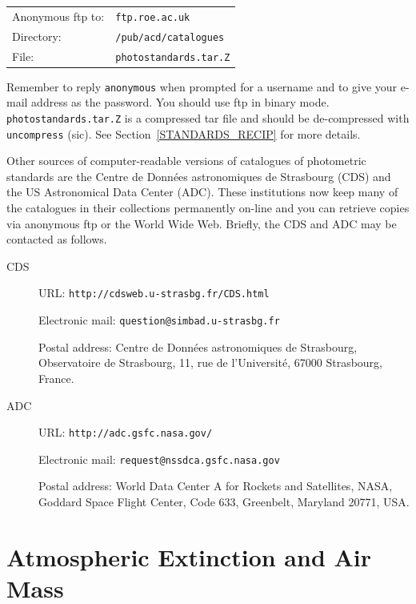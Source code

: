 \documentclass[twoside,11pt]{article}
\newcommand{\htmladdnormallink}[2]{#1}
\newcommand{\xlabel}[1]{}
\begin{document}
\begin{tabular}{ll}
Anonymous ftp to: & {\tt ftp.roe.ac.uk}        \\
Directory:        & {\tt /pub/acd/catalogues}  \\
File:             & {\tt photostandards.tar.Z} \\
\end{tabular}

Remember to reply {\tt anonymous} when prompted for a username and
to give your e-mail address as the password.  You should use ftp in
binary mode.  {\tt photostandards.tar.Z} is a compressed tar file
and should be de-compressed with {\tt uncompress} (sic).  See
Section~\ref{STANDARDS_RECIP} for more details.

Other sources of computer-readable versions of catalogues of photometric
standards are the Centre de Donn\'{e}es astronomiques de Strasbourg (CDS)
and the US Astronomical Data Center (ADC).  These institutions now keep
many of the catalogues in their collections permanently on-line and you
can retrieve copies via anonymous ftp or the World Wide Web.  Briefly,
the CDS and ADC may be contacted as follows.

\begin{description}

  \item[CDS] URL:
  \htmladdnormallink{ {\tt http://cdsweb.u-strasbg.fr/CDS.html} }
   {http://cdsweb.u-strasbg.fr/CDS.html}

   Electronic mail: {\tt question@simbad.u-strasbg.fr}

   Postal address: Centre de Donn\'{e}es astronomiques de
   Strasbourg, Observatoire de Strasbourg, 11, rue de l'Universit\'{e},
   67000 Strasbourg, France.

  \item[ADC]  URL: \htmladdnormallink{ {\tt http://adc.gsfc.nasa.gov/} }
   {http://adc.gsfc.nasa.gov/}

   Electronic mail: {\tt request@nssdca.gsfc.nasa.gov}

   Postal address: World Data Center A for Rockets and
   Satellites, NASA, Goddard Space Flight Center, Code 633,
   Greenbelt, Maryland 20771, USA.

\end{description}


\section{\xlabel{AIRMASS}\label{AIRMASS}Atmospheric Extinction and Air Mass}
\end{document}
